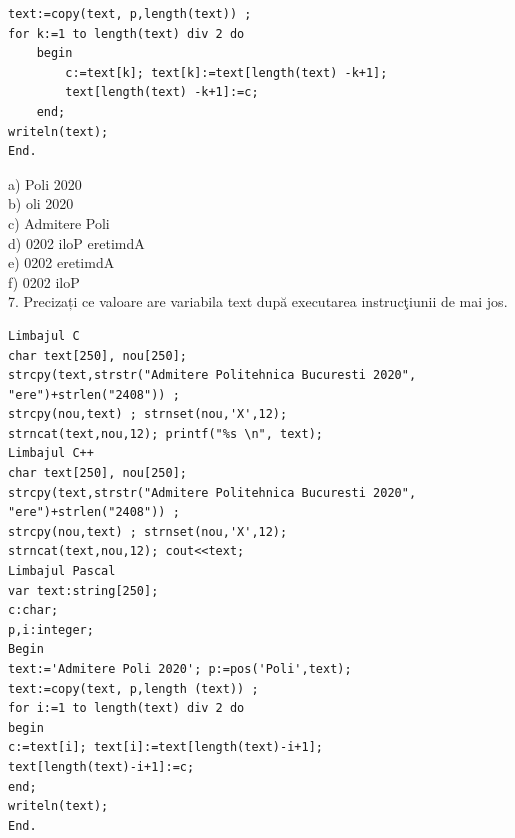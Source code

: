 \documentclass[10pt]{article}
\begin{document}
\begin{verbatim}
text:=copy(text, p,length(text)) ;
for k:=1 to length(text) div 2 do
    begin
        c:=text[k]; text[k]:=text[length(text) -k+1];
        text[length(text) -k+1]:=c;
    end;
writeln(text);
End.
\end{verbatim}

a) Poli 2020\\
b) oli 2020\\
c) Admitere Poli\\
d) 0202 iloP eretimdA\\
e) 0202 eretimdA\\
f) 0202 iloP\\
7. Precizați ce valoare are variabila text după executarea instrucţiunii de mai jos.

\begin{verbatim}
Limbajul C
char text[250], nou[250];
strcpy(text,strstr("Admitere Politehnica Bucuresti 2020",
"ere")+strlen("2408")) ;
strcpy(nou,text) ; strnset(nou,'X',12);
strncat(text,nou,12); printf("%s \n", text);
Limbajul C++
char text[250], nou[250];
strcpy(text,strstr("Admitere Politehnica Bucuresti 2020",
"ere")+strlen("2408")) ;
strcpy(nou,text) ; strnset(nou,'X',12);
strncat(text,nou,12); cout<<text;
Limbajul Pascal
var text:string[250];
c:char;
p,i:integer;
Begin
text:='Admitere Poli 2020'; p:=pos('Poli',text);
text:=copy(text, p,length (text)) ;
for i:=1 to length(text) div 2 do
begin
c:=text[i]; text[i]:=text[length(text)-i+1];
text[length(text)-i+1]:=c;
end;
writeln(text);
End.
\end{verbatim}
\end{document}

